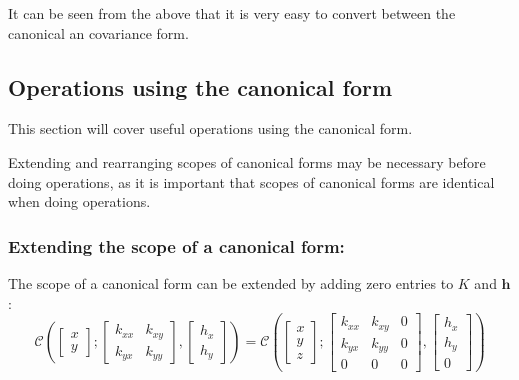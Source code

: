 \documentclass[12pt,oneside,openany,a4paper, %
afrikaans,english,
]{memoir}
\numberwithin{equation}{chapter}
\begin{document}
It can be seen from the above that it is very easy to convert between the canonical an covariance form. 
\subsection{Operations using the canonical form}
This section will cover useful operations using the canonical form. 

Extending and rearranging scopes of canonical forms may be necessary before doing operations, as it is important that scopes of canonical forms are identical when doing operations. 
\subsubsection{Extending the scope of a canonical form:}
The scope of a canonical form can be extended by adding zero entries to $K$ and $\bm{h}$:
\begin{equation}
\mathcal{C}\left(
\begin{bmatrix}
x\\
y
\end{bmatrix};
\begin{bmatrix}
k_{xx} & k_{xy}\\
k_{yx} & k_{yy}
\end{bmatrix},
\begin{bmatrix}
h_x\\
h_y
\end{bmatrix}
\right)
=
\mathcal{C}\left(
\begin{bmatrix}
x\\
y\\
z
\end{bmatrix};
\begin{bmatrix}
k_{xx} & k_{xy} & 0\\
k_{yx} & k_{yy} & 0\\
0 & 0 & 0
\end{bmatrix},
\begin{bmatrix}
h_x\\
h_y\\
0
\end{bmatrix}
\right)
\end{equation}
\end{document}
